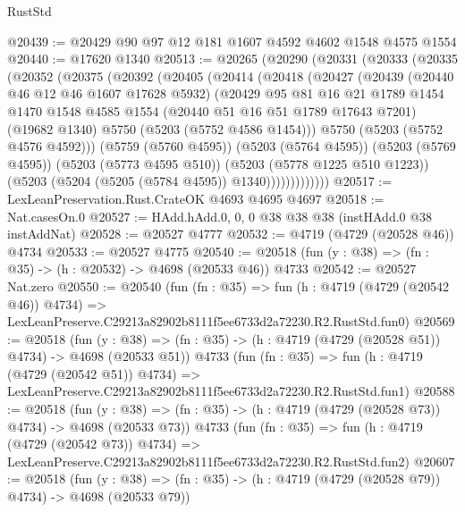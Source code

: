\begin{lexlean}{RustStd}
\begin{coremodule}
@20439 := @20429 @90 @97 @12 @181 @1607 @4592 @4602 @1548 @4575 @1554
@20440 := @17620 @1340
@20513 := @20265
    (@20290
      (@20331
        (@20333
          (@20335
            (@20352
              (@20375
                (@20392
                  (@20405
                    (@20414
                      (@20418
                        (@20427
                          (@20439
                            (@20440 @46 @12 @46 @1607 @17628 @5932)
                            (@20429
                              @95
                              @81
                              @16
                              @21
                              @1789
                              @1454
                              @1470
                              @1548
                              @4585
                              @1554
                              (@20440 @51 @16 @51 @1789 @17643 @7201)
                              (@19682 @1340)
                              @5750
                              (@5203 (@5752 @4586 @1454)))
                            @5750
                            (@5203 (@5752 @4576 @4592)))
                          (@5759 (@5760 @4595))
                          (@5203 (@5764 @4595))
                          (@5203 (@5769 @4595))
                          (@5203 (@5773 @4595 @510))
                          (@5203 (@5778 @1225 @510 @1223))
                          (@5203 (@5204 (@5205 (@5784 @4595)) @1340)))))))))))))
@20517 := LexLeanPreservation.Rust.CrateOK @4693 @4695 @4697
@20518 := Nat.casesOn.{0}
@20527 := HAdd.hAdd.{0, 0, 0} @38 @38 @38 (instHAdd.{0} @38 instAddNat)
@20528 := @20527 @4777
@20532 := @4719 (@4729 (@20528 @46)) @4734
@20533 := @20527 @4775
@20540 := @20518 (fun (y : @38) => (fn : @35) -> (h : @20532) -> @4698 (@20533 @46)) @4733
@20542 := @20527 Nat.zero
@20550 := @20540
    (fun (fn : @35) =>
    fun (h : @4719 (@4729 (@20542 @46)) @4734) =>
    LexLeanPreserve.C29213a82902b8111f5ee6733d2a72230.R2.RustStd.fun0)
@20569 := @20518
    (fun (y : @38) => (fn : @35) -> (h : @4719 (@4729 (@20528 @51)) @4734) -> @4698 (@20533 @51))
    @4733
    (fun (fn : @35) =>
    fun (h : @4719 (@4729 (@20542 @51)) @4734) =>
    LexLeanPreserve.C29213a82902b8111f5ee6733d2a72230.R2.RustStd.fun1)
@20588 := @20518
    (fun (y : @38) => (fn : @35) -> (h : @4719 (@4729 (@20528 @73)) @4734) -> @4698 (@20533 @73))
    @4733
    (fun (fn : @35) =>
    fun (h : @4719 (@4729 (@20542 @73)) @4734) =>
    LexLeanPreserve.C29213a82902b8111f5ee6733d2a72230.R2.RustStd.fun2)
@20607 := @20518
    (fun (y : @38) => (fn : @35) -> (h : @4719 (@4729 (@20528 @79)) @4734) -> @4698 (@20533 @79))

\end{coremodule}
\end{lexlean}
